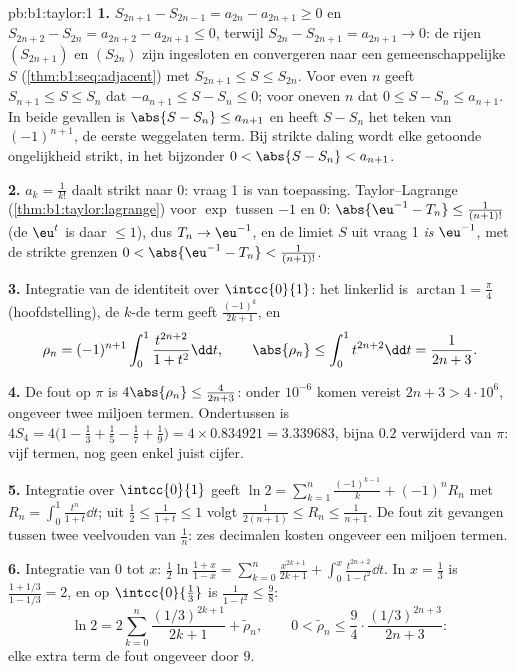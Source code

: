 \begin{solution}{pb:b1:taylor:1}
\textbf{1.} $S_{2n+1} - S_{2n-1} = a_{2n} - a_{2n+1} \geq 0$ en
$S_{2n+2} - S_{2n} = a_{2n+2} - a_{2n+1} \leq 0$, terwijl $S_{2n}
- S_{2n+1} = a_{2n+1} \to 0$: de rijen $(S_{2n+1})$ en
$(S_{2n})$ zijn ingesloten en convergeren naar een
gemeenschappelijke $S$ (\cref{thm:b1:seq:adjacent}) met $S_{2n+1}
\leq S \leq S_{2n}$. Voor even $n$ geeft $S_{n+1} \leq S \leq
S_n$ dat $-a_{n+1} \leq S - S_n \leq 0$; voor oneven $n$ dat $0
\leq S - S_n \leq a_{n+1}$. In beide gevallen is $\abs{S - S_n}
\leq a_{n+1}$ en heeft $S - S_n$ het teken van $(-1)^{n+1}$, de
eerste weggelaten term. Bij strikte daling wordt elke getoonde
ongelijkheid strikt, in het bijzonder $0 < \abs{S - S_n} <
a_{n+1}$.

\textbf{2.} $a_k = \frac{1}{k!}$ daalt strikt naar $0$: vraag 1
is van toepassing. Taylor--Lagrange
(\cref{thm:b1:taylor:lagrange}) voor $\exp$ tussen $-1$ en $0$:
$\abs{\eu^{-1} - T_n} \leq \frac{1}{(n+1)!}$ (de 
$\eu^t$ is daar $\leq 1$), dus $T_n \to \eu^{-1}$, en de limiet
$S$ uit vraag 1 \emph{is} $\eu^{-1}$, met de strikte grenzen $0 <
\abs{\eu^{-1} - T_n} < \frac{1}{(n+1)!}$.

\textbf{3.} Integratie van de identiteit over $\intcc{0}{1}$: het
linkerlid is $\arctan 1 = \frac\pi4$ (hoofdstelling), de $k$-de
term geeft $\frac{(-1)^k}{2k+1}$, en
\[
\rho_n = (-1)^{n+1}\int_0^1 \frac{t^{2n+2}}{1+t^2}\dd t,
\qquad
\abs{\rho_n} \leq \int_0^1 t^{2n+2}\dd t = \frac{1}{2n+3} .
\]

\textbf{4.} De fout op $\pi$ is $4\abs{\rho_n} \leq
\frac{4}{2n+3}$: onder $10^{-6}$ komen vereist $2n + 3 >
4\cdot10^6$, ongeveer twee miljoen termen. Ondertussen is $4S_4 =
4\bigl(1 - \frac13 + \frac15 - \frac17 + \frac19\bigr) = 4 \times
0.834921 = 3.339683$, bijna $0.2$ verwijderd van $\pi$: vijf
termen, nog geen enkel juist cijfer.

\textbf{5.} Integratie over $\intcc{0}{1}$ geeft $\ln 2 =
\sum_{k=1}^{n} \frac{(-1)^{k-1}}{k} + (-1)^n R_n$ met $R_n =
\int_0^1 \frac{t^n}{1+t}\dd t$; uit $\frac12 \leq \frac{1}{1+t}
\leq 1$ volgt $\frac{1}{2(n+1)} \leq R_n \leq \frac{1}{n+1}$. De
fout zit gevangen tussen twee veelvouden van $\frac1n$: zes
decimalen kosten ongeveer een miljoen termen.

\textbf{6.} Integratie van $0$ tot $x$: $\frac12\ln\frac{1 +
x}{1 - x} = \sum_{k=0}^{n} \frac{x^{2k+1}}{2k+1} + \int_0^x
\frac{t^{2n+2}}{1-t^2}\dd t$. In $x = \frac13$ is $\frac{1 +
1/3}{1 - 1/3} = 2$, en op $\intcc{0}{\frac13}$ is $\frac{1}{1 -
t^2} \leq \frac98$:
\[
\ln 2 = 2\sum_{k=0}^{n} \frac{(1/3)^{2k+1}}{2k+1} +
\tilde\rho_n,
\qquad
0 < \tilde\rho_n \leq \frac{9}{4}\cdot
\frac{(1/3)^{2n+3}}{2n+3} :
\]
elke extra term  de fout ongeveer door $9$.


\end{solution}
